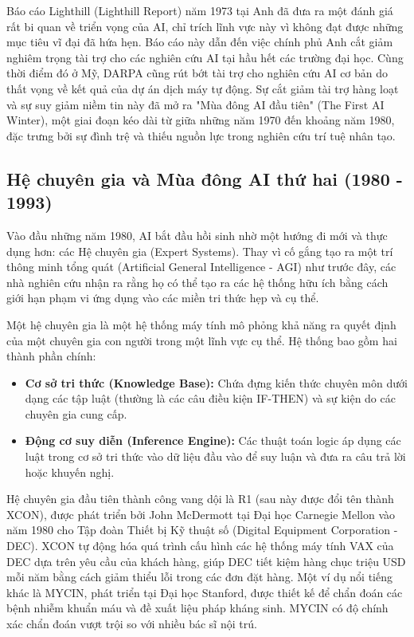\documentclass[12pt,a4paper]{article}
\begin{document}
Báo cáo Lighthill (Lighthill Report) năm 1973 tại Anh đã đưa ra một đánh giá rất bi quan về triển vọng của AI, chỉ trích lĩnh vực này vì không đạt được những mục tiêu vĩ đại đã hứa hẹn. Báo cáo này dẫn đến việc chính phủ Anh cắt giảm nghiêm trọng tài trợ cho các nghiên cứu AI tại hầu hết các trường đại học. Cùng thời điểm đó ở Mỹ, DARPA cũng rút bớt tài trợ cho nghiên cứu AI cơ bản do thất vọng về kết quả của dự án dịch máy tự động. Sự cắt giảm tài trợ hàng loạt và sự suy giảm niềm tin này đã mở ra "Mùa đông AI đầu tiên" (The First AI Winter), một giai đoạn kéo dài từ giữa những năm 1970 đến khoảng năm 1980, đặc trưng bởi sự đình trệ và thiếu nguồn lực trong nghiên cứu trí tuệ nhân tạo.

\newpage

\subsection{Hệ chuyên gia và Mùa đông AI thứ hai (1980 - 1993)}

Vào đầu những năm 1980, AI bắt đầu hồi sinh nhờ một hướng đi mới và thực dụng hơn: các Hệ chuyên gia (Expert Systems). Thay vì cố gắng tạo ra một trí thông minh tổng quát (Artificial General Intelligence - AGI) như trước đây, các nhà nghiên cứu nhận ra rằng họ có thể tạo ra các hệ thống hữu ích bằng cách giới hạn phạm vi ứng dụng vào các miền tri thức hẹp và cụ thể.

Một hệ chuyên gia là một hệ thống máy tính mô phỏng khả năng ra quyết định của một chuyên gia con người trong một lĩnh vực cụ thể. Hệ thống bao gồm hai thành phần chính:
\begin{itemize}
    \item \textbf{Cơ sở tri thức (Knowledge Base):} Chứa đựng kiến thức chuyên môn dưới dạng các tập luật (thường là các câu điều kiện IF-THEN) và sự kiện do các chuyên gia cung cấp.
    \item \textbf{Động cơ suy diễn (Inference Engine):} Các thuật toán logic áp dụng các luật trong cơ sở tri thức vào dữ liệu đầu vào để suy luận và đưa ra câu trả lời hoặc khuyến nghị.
\end{itemize}

Hệ chuyên gia đầu tiên thành công vang dội là R1 (sau này được đổi tên thành XCON), được phát triển bởi John McDermott tại Đại học Carnegie Mellon vào năm 1980 cho Tập đoàn Thiết bị Kỹ thuật số (Digital Equipment Corporation - DEC). XCON tự động hóa quá trình cấu hình các hệ thống máy tính VAX của DEC dựa trên yêu cầu của khách hàng, giúp DEC tiết kiệm hàng chục triệu USD mỗi năm bằng cách giảm thiểu lỗi trong các đơn đặt hàng. Một ví dụ nổi tiếng khác là MYCIN, phát triển tại Đại học Stanford, được thiết kế để chẩn đoán các bệnh nhiễm khuẩn máu và đề xuất liệu pháp kháng sinh. MYCIN có độ chính xác chẩn đoán vượt trội so với nhiều bác sĩ nội trú.
\end{document}
